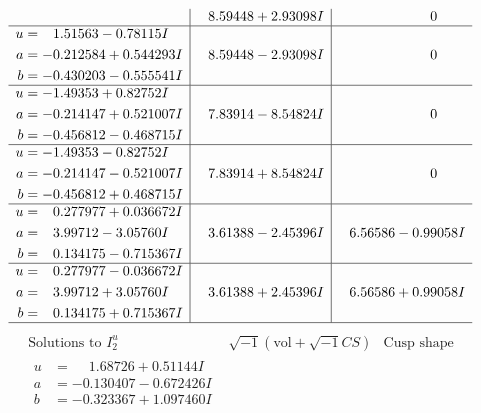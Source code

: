 \documentclass[1p]{elsarticle_modified}
\theoremstyle{definition}
\newcommand{\I}{\sqrt{-1}}
\begin{document}
$$\begin{array}{c|c|c}
 & \phantom{-}8.59448 + 2.93098 I & \phantom{-0.000000 } 0 \\ \hline\begin{aligned}
u &= \phantom{-}1.51563 - 0.78115 I \\
a &= -0.212584 + 0.544293 I \\
b &= -0.430203 - 0.555541 I\end{aligned}
 & \phantom{-}8.59448 - 2.93098 I & \phantom{-0.000000 } 0 \\ \hline\begin{aligned}
u &= -1.49353 + 0.82752 I \\
a &= -0.214147 + 0.521007 I \\
b &= -0.456812 - 0.468715 I\end{aligned}
 & \phantom{-}7.83914 - 8.54824 I & \phantom{-0.000000 } 0 \\ \hline\begin{aligned}
u &= -1.49353 - 0.82752 I \\
a &= -0.214147 - 0.521007 I \\
b &= -0.456812 + 0.468715 I\end{aligned}
 & \phantom{-}7.83914 + 8.54824 I & \phantom{-0.000000 } 0 \\ \hline\begin{aligned}
u &= \phantom{-}0.277977 + 0.036672 I \\
a &= \phantom{-}3.99712 - 3.05760 I \\
b &= \phantom{-}0.134175 - 0.715367 I\end{aligned}
 & \phantom{-}3.61388 - 2.45396 I & \phantom{-}6.56586 - 0.99058 I \\ \hline\begin{aligned}
u &= \phantom{-}0.277977 - 0.036672 I \\
a &= \phantom{-}3.99712 + 3.05760 I \\
b &= \phantom{-}0.134175 + 0.715367 I\end{aligned}
 & \phantom{-}3.61388 + 2.45396 I & \phantom{-}6.56586 + 0.99058 I\\
 \hline 
 \end{array}$$\newpage$$\begin{array}{c|c|c}  
\text{Solutions to }I^u_{2}& \I (\text{vol} + \sqrt{-1}CS) & \text{Cusp shape}\\
 \hline 
\begin{aligned}
u &= \phantom{-}1.68726 + 0.51144 I \\
a &= -0.130407 - 0.672426 I \\
b &= -0.323367 + 1.097460 I\end{aligned}

\end{array}$$
\end{document}
